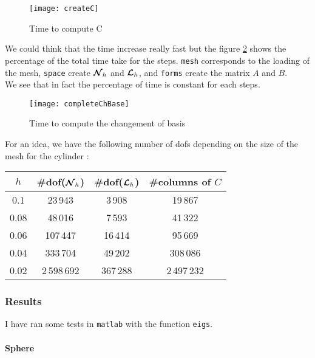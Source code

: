 \begin{figure}[H]
  \centering
  \texttt{[image: createC]}
  \caption{Time to compute C}
  \label{timeC}
\end{figure}

We could think that the time increase really fast but the figure \ref{completeTime} shows the percentage of the total time take for the steps. \texttt{mesh} corresponds to the loading of the mesh, \texttt{space} create ${\bm{\mathcal{N}}}_h$ and ${\bm{\mathcal{L}}}_h$, and \texttt{forms} create the matrix $A$ and $B$.\\
We see that in fact the percentage of time is constant for each steps.

\begin{figure}[H]
  \centering
  \texttt{[image: completeChBase]}
  \caption{Time to compute the changement of basis}
  \label{completeTime}
\end{figure}

For an idea, we have the following number of dofs depending on the size of the mesh for the cylinder :
\begin{center}
  \begin{tabular}{ c | c | c | c }
    $h$ & \#dof(${\bm{\mathcal{N}}}_h$) & \#dof(${\bm{\mathcal{L}}}_h$) & \#columns of $C$ \\ \hline
    0.1 & 23\,943 & 3\,908 & 19\,867 \\ \hline
    0.08 & 48\,016 & 7\,593 & 41\,322 \\ \hline
    0.06 & 107\,447 & 16\,414 & 95\,669 \\ \hline
    0.04 & 333\,704 & 49\,202 & 308\,086 \\ \hline
    0.02 & 2\,598\,692 & 367\,288 & 2\,497\,232 \\ \hline
  \end{tabular}
\end{center}

\subsubsection{Results}

I have ran some tests in \texttt{matlab} with the function \texttt{eigs}. 
\paragraph{Sphere}

